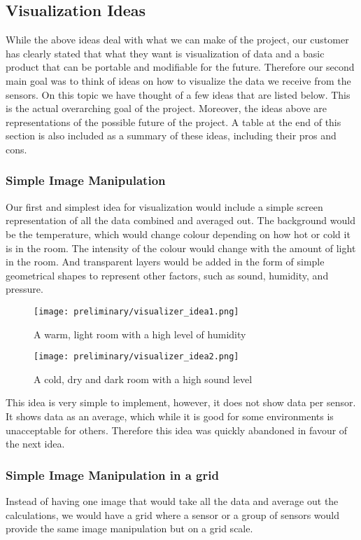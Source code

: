 \documentclass[../document]{subfiles}
\begin{document}
\subsection{Visualization Ideas}
While the above ideas deal with what we can make of the project, our customer has clearly stated that what they want is visualization of data and a basic product that can be portable and modifiable for the future. Therefore our second main goal was to think of ideas on how to visualize the data we receive from the sensors. On this topic we have thought of a few ideas that are listed below. This is the actual overarching goal of the project. Moreover, the ideas above are representations of the possible future of the project. A table at the end of this section is also included as a summary of these ideas, including their pros and cons.

\subsubsection{Simple Image Manipulation}
Our first and simplest idea for visualization would include a simple screen representation of all the data combined and averaged out. The background would be the temperature, which would change colour depending on how hot or cold it is in the room. The intensity of the colour would change with the amount of light in the room. And transparent layers would be added in the form of simple geometrical shapes to represent other factors, such as sound, humidity, and pressure.

\begin{figure}
	\texttt{[image: preliminary/visualizer\_idea1.png]}
	\caption{A warm, light room with a high level of humidity}
\end{figure}

\begin{figure}
	\texttt{[image: preliminary/visualizer\_idea2.png]}
	\caption{A cold, dry and dark room with a high sound level}
\end{figure}

This idea is very simple to implement, however, it does not show data per sensor. It shows data as an average, which while it is good for some environments is unacceptable for others. Therefore this idea was quickly abandoned in favour of the next idea.

\subsubsection{Simple Image Manipulation in a grid}
Instead of having one image that would take all the data and average out the calculations, we would have a grid where a sensor or a group of sensors would provide the same image manipulation but on a grid scale.
\end{document}
